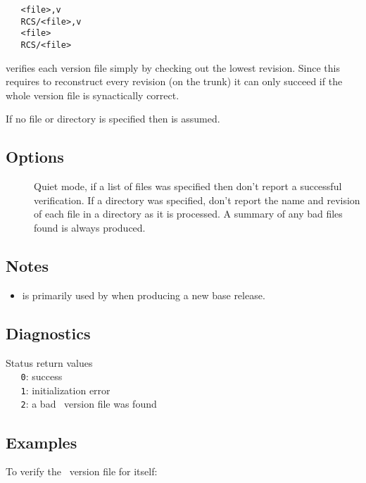 \begin{verbatim}
   <file>,v
   RCS/<file>,v
   <file>
   RCS/<file>
\end{verbatim}

 verifies each version file simply by checking out the lowest
revision.  Since this requires  to reconstruct every revision (on
the trunk) it can only succeed if the whole version file is synactically
correct.

If no file or directory is specified then  is assumed.

\subsection*{Options}

\begin{description}
\item[]
   Quiet mode, if a list of files was specified then don't report a successful
   verification.  If a directory was specified, don't report the name and
   revision of each file in a directory as it is processed.  A summary of any
   bad files found is always produced.
\end{description}

\subsection*{Notes}
 
\begin{itemize}
\item
    is primarily used by  when producing a new base
   release.
\end{itemize}

\subsection*{Diagnostics}

Status return values
\\ \verb+   0+: success
\\ \verb+   1+: initialization error
\\ \verb+   2+: a bad \rcs\ version file was found

\subsection*{Examples}

To verify the \rcs\ version file for  itself:

